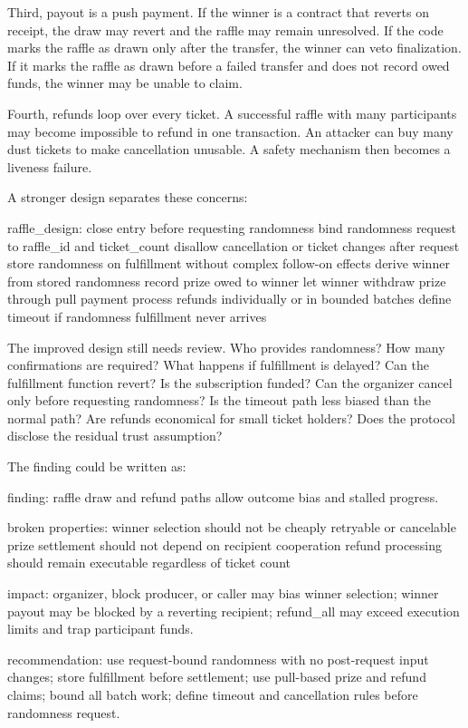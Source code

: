 Third, payout is a push payment. If the winner is a contract that reverts on receipt, the draw may revert and the raffle may remain unresolved. If the code marks the raffle as drawn only after the transfer, the winner can veto finalization. If it marks the raffle as drawn before a failed transfer and does not record owed funds, the winner may be unable to claim.

Fourth, refunds loop over every ticket. A successful raffle with many participants may become impossible to refund in one transaction. An attacker can buy many dust tickets to make cancellation unusable. A safety mechanism then becomes a liveness failure.

A stronger design separates these concerns:

\begin{codeblock}
raffle_design:
    close entry before requesting randomness
    bind randomness request to raffle_id and ticket_count
    disallow cancellation or ticket changes after request
    store randomness on fulfillment without complex follow-on effects
    derive winner from stored randomness
    record prize owed to winner
    let winner withdraw prize through pull payment
    process refunds individually or in bounded batches
    define timeout if randomness fulfillment never arrives
\end{codeblock}

The improved design still needs review. Who provides randomness? How many confirmations are required? What happens if fulfillment is delayed? Can the fulfillment function revert? Is the subscription funded? Can the organizer cancel only before requesting randomness? Is the timeout path less biased than the normal path? Are refunds economical for small ticket holders? Does the protocol disclose the residual trust assumption?

The finding could be written as:

\begin{codeblock}
finding:
    raffle draw and refund paths allow outcome bias and stalled progress.

broken properties:
    winner selection should not be cheaply retryable or cancelable
    prize settlement should not depend on recipient cooperation
    refund processing should remain executable regardless of ticket count

impact:
    organizer, block producer, or caller may bias winner selection;
    winner payout may be blocked by a reverting recipient;
    refund_all may exceed execution limits and trap participant funds.

recommendation:
    use request-bound randomness with no post-request input changes;
    store fulfillment before settlement;
    use pull-based prize and refund claims;
    bound all batch work;
    define timeout and cancellation rules before randomness request.
\end{codeblock}

